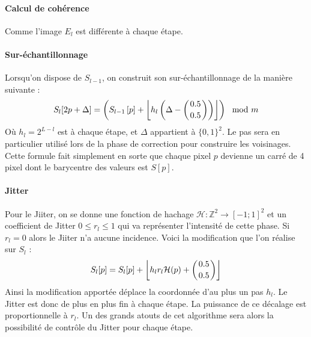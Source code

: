 \documentclass[12pt]{article}
\newcommand{\Z}{\mathbb{Z}}
\begin{document}
\paragraph{Calcul de cohérence}

Comme l'image $E_l$ est différente à chaque étape.

\paragraph{Sur-échantillonnage}
Lorsqu'on dispose de $S_{l-1}$, on construit son sur-échantillonnage de la manière suivante :
$$ S_l [2p + \Delta] = \left( S_{l-1} \left[ p \right] + \left\lfloor h_l \left( \Delta - \left( 0.5 \atop 0.5 \right) \right) \right\rfloor \right) \mod m $$
Où $h_l = 2^{L-l}$ est  à chaque étape, et $\Delta$ appartient à $\{ 0, 1 \}^2$. Le pas sera en particulier utilisé lors de la phase de correction pour construire les voisinages. Cette formule fait simplement en sorte que chaque pixel $p$ devienne un carré de 4 pixel dont le barycentre des valeurs est $S[p]$.

\paragraph{Jitter}
Pour le Jiiter, on se donne une fonction de hachage $\mathcal{H} : \Z^2 \rightarrow [ -1; 1 ]^2$ et un coefficient de Jitter $0 \leqslant r_l \leqslant 1$ qui va représenter l'intensité de cette phase. Si $r_l = 0$ alors le Jiiter n'a aucune incidence. Voici la modification que l'on réalise sur $S_l$ :
$$ S_l[p] = S_l[p] + \left\lfloor h_l r_l \mathcal{H}(p) + \left( 0.5 \atop 0.5 \right) \right\rfloor $$
Ainsi la modification apportée déplace la coordonnée d'au plus un pas $h_l$. Le Jitter est donc de plus en plus fin à chaque étape. La puissance de ce décalage est proportionnelle à $r_l$. Un des grands atouts de cet algorithme sera alors la possibilité de contrôle du Jitter pour chaque étape.
\end{document}
